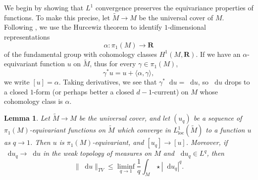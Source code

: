 \documentclass[reqno,11pt]{amsart}
\newcommand{\RR}{\mathbf{R}}
\newcommand*\dif{\mathop{}\!\mathrm{d}}
\newcommand{\loc}{\mathrm{loc}}
\newtheorem{lemma}[theorem]{Lemma}
\theoremstyle{definition}
\numberwithin{equation}{section}
\begin{document}
We begin by showing that $L^1$ convergence preserves the equivariance properties of functions.
To make this precise, let $\tilde M \to M$ be the universal cover of $M$.
Following \cite[\S4]{daskalopoulos2020transverse}, we use the Hurcewiz theorem to identify $1$-dimensional representations
$$\alpha: \pi_1(M) \to \RR$$
of the fundamental group with cohomology classes $H^1(M, \RR)$.
If we have an $\alpha$-equivariant function $u$ on $\tilde M$, thus for every $\gamma \in \pi_1(M)$,
$$\gamma^* u = u + \langle \alpha, \gamma\rangle,$$
we write $[u] = \alpha$.
Taking derivatives, we see that $\gamma^* \dif u = \dif u$, so $\dif u$ drops to a closed $1$-form (or perhaps better a closed $d-1$-current) on $M$ whose cohomology class is $\alpha$.

\begin{lemma}\label{L1 convergence preserves pi1}
Let $\tilde M \to M$ be the universal cover, and let $(u_q)$ be a sequence of $\pi_1(M)$-equivariant functions on $\tilde M$ which converge in $L^1_\loc(\tilde M)$ to a function $u$ as $q \to 1$.
Then $u$ is $\pi_1(M)$-equivariant, and $[u_q] \to [u]$.
Moreover, if $\dif u_q \to \dif u$ in the weak topology of measures on $M$ and $\dif u_q \in L^q$, then
\begin{equation}\label{q to 1 Holder}
\|\dif u\|_{TV} \leq \liminf_{q \to 1} \frac{1}{q} \int_M \star |\dif u_q|^q.
\end{equation}
\end{lemma}
\end{document}
